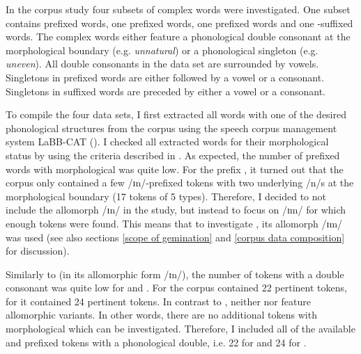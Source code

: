 In the corpus study four subsets of complex words were investigated. One subset contains prefixed words, one prefixed words,
 one prefixed words and one -suffixed words. The complex words either feature a phonological double consonant at the morphological boundary (e.g. \textit{unnatural}) or a phonological singleton (e.g. \textit{uneven}).
All double consonants in the data set are surrounded by vowels. Singletons in prefixed words are either followed by a vowel or a consonant. Singletons in suffixed words are preceded by either a vowel or a consonant.

To compile the four data sets, I first extracted all words with one of the desired phonological structures from the corpus using the speech corpus management system LaBB-CAT (\citealt{Fromont.2012,Fromont.20032015}).  
I checked all extracted words for their morphological status by using the criteria described in .
As expected, the number of prefixed words with morphological  was quite low. 
For the prefix ,
it turned out that the corpus only contained a few /ɪn/-prefixed tokens with two underlying /n/s at the morphological boundary (17 tokens of 5 types). Therefore, I decided to not include the allomorph /ɪn/ in the study, but instead to focus on /ɪm/ for which enough tokens were found. This means that to investigate , its allomorph /ɪm/ was used (see also sections \ref{scope of gemination} and \ref{corpus data composition} for discussion).

Similarly to  (in its allomorphic form /ɪn/), the number of tokens with a double consonant was quite low for  and . For  the corpus contained 22 pertinent tokens, for  it contained 24 pertinent tokens. In contrast to , neither  nor  feature allomorphic variants. In other words, there are no additional tokens with morphological  which can be investigated. Therefore, I included all of the available  and prefixed tokens with a phonological double, i.e. 22 for  and 24 for . 

